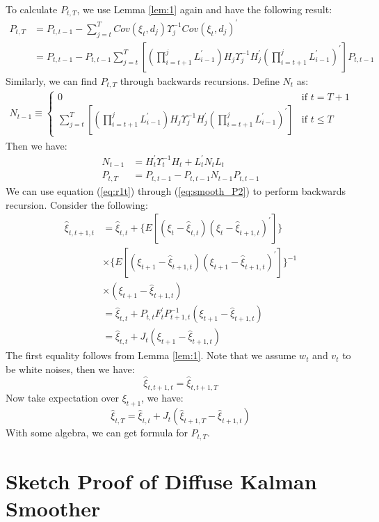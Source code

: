 \documentclass[12pt]{article}
\numberwithin{equation}{section}
\begin{document}
To calculate $P_{t,T}$, we use Lemma \ref{lem:1} again and have the following result:
\begin{align*}
    P_{t,T} &= P_{t,t-1} - \sum_{j=t}^TCov(\xi_t,d_j)\Upsilon_j^{-1}Cov(\xi_t,d_j)^{'} \\
    &=P_{t,t-1} - P_{t,t-1}\sum_{j=t}^{T}\left[\left(\prod_{i=t+1}^{j}L_{i-1}^{'}\right)H_j\Upsilon_j^{-1}H_j^{'}\left(\prod_{i=t+1}^{j}L_{i-1}^{'}\right)^{'}\right]P_{t,t-1}
\end{align*}
Similarly, we can find $P_{t,T}$ through backwards recursions. Define $N_t$ as:
\begin{align*}
    N_{t-1} \equiv \begin{cases}
        0 & \text{if $t=T+1$} \\
        \sum_{j=t}^{T}\left[\left(\prod_{i=t+1}^{j}L_{i-1}^{'}\right)H_j\Upsilon_j^{-1}H_j^{'}\left(\prod_{i=t+1}^{j}L_{i-1}^{'}\right)^{'}\right] & \text{if $t\leq T$}
    \end{cases}
\end{align*}
Then we have:
\begin{align}
    N_{t-1} &= H_t^{'}\Upsilon_t^{-1}H_t + L_t^{'}N_tL_t \\
    P_{t,T} &= P_{t,t-1}- P_{t,t-1}N_{t-1}P_{t,t-1} 
\end{align}
We can use equation (\ref{eq:r1t}) through (\ref{eq:smooth_P2}) to perform backwards recursion.
Consider the following:
\begin{align*}
    \hat{\xi}_{t,t+1,t} &= \hat{\xi}_{t,t} + \{E[(\xi_t-\hat{\xi}_{t,t})(\xi_t-\hat{\xi}_{t+1,t})^{'}]\} \\
    & \times \{E[(\xi_{t+1}-\hat{\xi}_{t+1,t})(\xi_{t+1}-\hat{\xi}_{t+1,t})^{'}]\}^{-1} \\
    & \times (\xi_{t+1} - \hat{\xi}_{t+1,t}) \\
    &= \hat{\xi}_{t,t} + P_{t,t}F_t^{'}P_{t+1,t}^{-1}(\xi_{t+1}-\hat{\xi}_{t+1,t}) \\
    &= \hat{\xi}_{t,t} + J_t(\xi_{t+1}-\hat{\xi}_{t+1,t})
\end{align*}
The first equality follows from Lemma \ref{lem:1}. Note that we assume $w_t$ and $v_t$ to be white noises, then we have:
\[
    \hat{\xi}_{t,t+1,t} = \hat{\xi}_{t,t+1,T}
\]
Now take expectation over $\xi_{t+1}$, we have:
\[
    \hat{\xi}_{t,T} = \hat{\xi}_{t,t} + J_t(\hat{\xi}_{t+1,T}-\hat{\xi}_{t+1,t})
\]
With some algebra, we can get formula for $P_{t,T}$.

\section{Sketch Proof of Diffuse Kalman Smoother} \label{ap:init_smoother}
\end{document}
